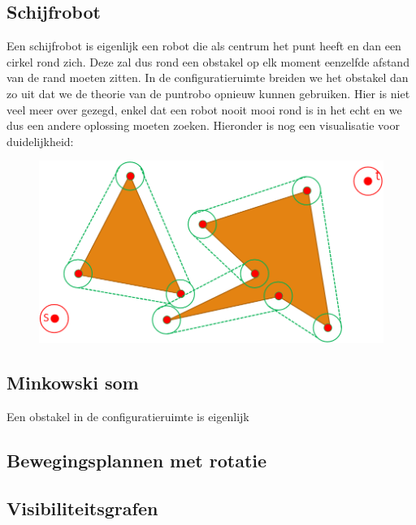 \documentclass[12pt,a4paper]{article}
\begin{document}
	\subsection{Schijfrobot}
	Een schijfrobot is eigenlijk een robot die als centrum het punt heeft en dan een cirkel rond zich. Deze zal dus rond een obstakel op elk moment eenzelfde afstand van de rand moeten zitten. In de configuratieruimte breiden we het obstakel dan zo uit dat we de theorie van de puntrobo opnieuw kunnen gebruiken. Hier is niet veel meer over gezegd, enkel dat een robot nooit mooi rond is in het echt en we dus een andere oplossing moeten zoeken. Hieronder is nog een visualisatie voor duidelijkheid: 
	\begin{figure}[H]
		\centering
		\includegraphics[width=0.6\linewidth]{afbeeldingen/Motion-plannine/schijfrobot}
		\label{fig:schijfrobot}
	\end{figure}
	
	
	\subsection{Minkowski som}
	Een obstakel in de configuratieruimte is eigenlijk 
	
	
	\subsection{Bewegingsplannen met rotatie}
	
	
	\subsection{Visibiliteitsgrafen}
	
	
\end{document}
